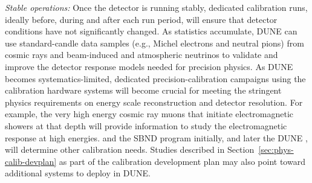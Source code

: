 
\textit{Stable operations:} Once the detector is running stably, dedicated calibration runs, ideally before, during and after each run period, will ensure that detector conditions have not significantly changed.
As statistics accumulate, DUNE can use standard-candle data samples (e.g., Michel electrons and neutral pions) from cosmic rays and beam-induced and atmospheric neutrinos to validate and improve the detector response models needed for precision physics. 
As DUNE becomes systematics-limited, dedicated precision-calibration campaigns using the calibration hardware systems will become crucial for meeting the stringent physics requirements on energy scale reconstruction and detector resolution. For example, the very high energy cosmic ray muons that initiate electromagnetic showers  at that depth 
will provide information to study the electromagnetic  response at high energies. 
 and the SBND program initially, and later the DUNE , will determine other calibration needs. Studies described in Section~\ref{sec:phys-calib-devplan} as part of the calibration development plan may also point toward additional systems to deploy in DUNE.

